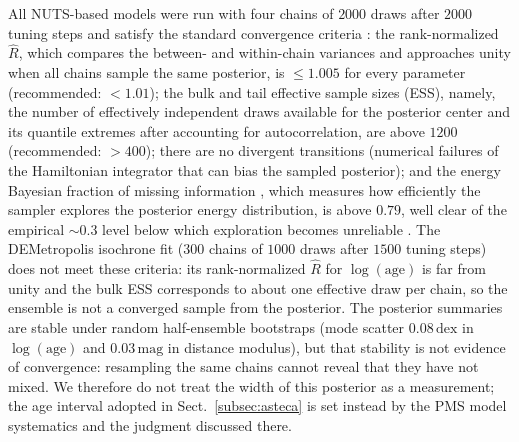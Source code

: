 \documentclass{aa}
\begin{document}
All NUTS-based models were run with four chains of $2000$ draws after $2000$ tuning steps and satisfy the standard convergence criteria \citep{2021BayAn..16..667V}: the rank-normalized $\hat{R}$, which compares the between- and within-chain variances and approaches unity when all chains sample the same posterior, is $\leq1.005$ for every parameter (recommended: $<1.01$); the bulk and tail effective sample sizes (ESS), namely, the number of effectively independent draws available for the posterior center and its quantile extremes after accounting for autocorrelation, are above $1200$ (recommended: $>400$); there are no divergent transitions (numerical failures of the Hamiltonian integrator that can bias the sampled posterior); and the energy Bayesian fraction of missing information \citep[E-BFMI;][]{2016arXiv160400695B}, which measures how efficiently the sampler explores the posterior energy distribution, is above $0.79$, well clear of the empirical ${\sim}0.3$ level below which exploration becomes unreliable \citep{2017arXiv170102434B}. The DEMetropolis isochrone fit ($300$ chains of $1000$ draws after $1500$ tuning steps) does not meet these criteria: its rank-normalized $\hat{R}$ for $\log(\mathrm{age})$ is far from unity and the bulk ESS corresponds to about one effective draw per chain, so the ensemble is not a converged sample from the posterior. The posterior summaries are stable under random half-ensemble bootstraps (mode scatter $0.08\,\mathrm{dex}$ in $\log(\mathrm{age})$ and $0.03\,\mathrm{mag}$ in distance modulus), but that stability is not evidence of convergence: resampling the same chains cannot reveal that they have not mixed. We therefore do not treat the width of this posterior as a measurement; the age interval adopted in Sect.~\ref{subsec:asteca} is set instead by the PMS model systematics and the judgment discussed there.
\end{document}
